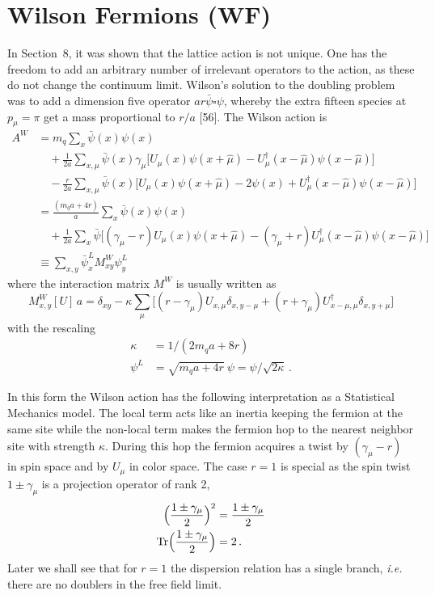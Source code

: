 \chapter{Wilson Fermions (WF)}

In Section~8, it was shown that the lattice action is not unique.  One has the
freedom to add an arbitrary number of irrelevant operators to the action, as
these do not change the continuum limit.  Wilson's solution to the doubling
problem was to add a dimension five operator $a r \bar\psi \square \psi$,
whereby the extra fifteen species at $p_\mu = \pi$ get a mass proportional to
$r/a$ [56].  The Wilson action is
\begin{align}
A^W &= m_q \sum_x \bar\psi(x)\psi(x) \nonumber\\
&\quad + \frac{1}{2a}\sum_{x,\mu} \bar\psi(x)\gamma_\mu \bigl[ U_\mu(x)\psi(x+\hat{\mu}) - U_\mu^\dagger(x-\hat{\mu})\psi(x-\hat{\mu}) \bigr] \nonumber\\
&\quad - \frac{r}{2a}\sum_{x,\mu} \bar\psi(x) \bigl[ U_\mu(x)\psi(x+\hat{\mu}) - 2\psi(x) + U_\mu^\dagger(x-\hat{\mu})\psi(x-\hat{\mu}) \bigr] \nonumber\\
&= \frac{(m_q a + 4r)}{a}\sum_x \bar\psi(x)\psi(x) \nonumber\\
&\quad + \frac{1}{2a}\sum_x \bar\psi \bigl[ (\gamma_\mu - r) U_\mu(x)\psi(x+\hat{\mu}) - (\gamma_\mu + r) U_\mu^\dagger(x-\hat{\mu})\psi(x-\hat{\mu}) \bigr] \nonumber\\
&\equiv \sum_{x,y} \bar\psi^L_x M^W_{xy} \psi^L_y
\end{align}
where the interaction matrix $M^W$ is usually written as
\begin{equation}
M^W_{x,y}[U]\,a = \delta_{xy} - \kappa \sum_\mu \bigl[ (r - \gamma_\mu) U_{x,\mu}\delta_{x,y-\mu} + (r + \gamma_\mu) U^\dagger_{x-\mu,\mu}\delta_{x,y+\mu} \bigr]
\end{equation}
with the rescaling
\begin{align}
\kappa &= 1/(2m_q a + 8r) \nonumber\\
\psi^L &= \sqrt{m_q a + 4r}\ \psi = \psi/\sqrt{2\kappa} \,.
\end{align}

In this form the Wilson action has the following interpretation as a
Statistical Mechanics model.  The local term acts like an inertia keeping the
fermion at the same site while the non-local term makes the fermion hop to the
nearest neighbor site with strength $\kappa$.  During this hop the fermion
acquires a twist by $(\gamma_\mu - r)$ in spin space and by $U_\mu$ in color
space.  The case $r = 1$ is special as the spin twist $1 \pm \gamma_\mu$ is a
projection operator of rank 2,
\begin{align}
\Bigl( \frac{1 \pm \gamma_\mu}{2} \Bigr)^2 &= \frac{1 \pm \gamma_\mu}{2} \nonumber\\
\mathrm{Tr} \Bigl( \frac{1 \pm \gamma_\mu}{2} \Bigr) &= 2 \,.
\end{align}
Later we shall see that for $r = 1$ the dispersion relation has a single
branch, \textit{i.e.} there are no doublers in the free field limit.

